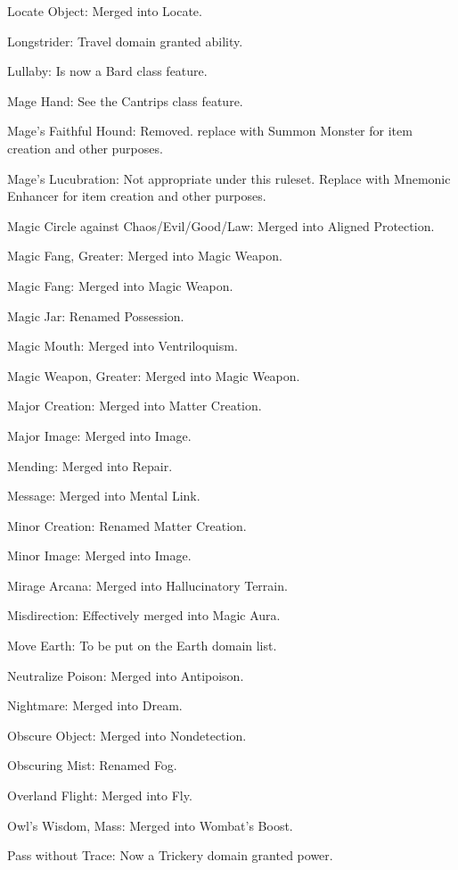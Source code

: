 {\begin{list}{}{\leftmargin=1em}
 \item Locate Object: Merged into Locate.
 \item Longstrider: Travel domain granted ability.
 \item Lullaby: Is now a Bard class feature.
 \item Mage Hand: See the Cantrips class feature.
 \item Mage's Faithful Hound: Removed. replace with Summon Monster for item creation and other purposes.
 \item Mage's Lucubration: Not appropriate under this ruleset. Replace with Mnemonic Enhancer for item creation and other purposes.
 \item Magic Circle against Chaos/Evil/Good/Law: Merged into Aligned Protection.
 \item Magic Fang, Greater: Merged into Magic Weapon.
 \item Magic Fang: Merged into Magic Weapon.
 \item Magic Jar: Renamed Possession.
 \item Magic Mouth: Merged into Ventriloquism.
 \item Magic Weapon, Greater: Merged into Magic Weapon.
 \item Major Creation: Merged into Matter Creation.
 \item Major Image: Merged into Image.
 \item Mending: Merged into Repair.
 \item Message: Merged into Mental Link.
 \item Minor Creation: Renamed Matter Creation.
 \item Minor Image: Merged into Image.
 \item Mirage Arcana: Merged into Hallucinatory Terrain.
 \item Misdirection: Effectively merged into Magic Aura.
 \item Move Earth: To be put on the Earth domain list.
 \item Neutralize Poison: Merged into Antipoison.
 \item Nightmare: Merged into Dream.
 \item Obscure Object: Merged into Nondetection.
 \item Obscuring Mist: Renamed Fog.
 \item Overland Flight: Merged into Fly.
 \item Owl's Wisdom, Mass: Merged into Wombat's Boost.
 \item Pass without Trace: Now a Trickery domain granted power.

\end{list}}
